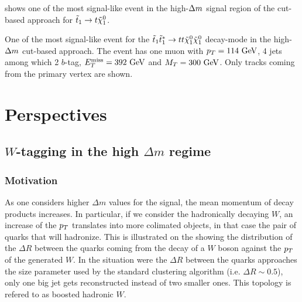      shows one of the most signal-like event in the
    high-$\Delta m$ signal region of the cut-based approach for $\tilde{t}_1 \rightarrow t \tilde{\chi}_1^0$.

    {One of the most signal-like event for the $\tilde{t}_1 \tilde{t}_1^{*} \rightarrow t t \tilde{\chi}_1^0 \tilde{\chi}_1^0$ decay-mode in the high-$\Delta m$ cut-based approach. The event has one muon with $p_T = 114~\text{GeV}$, 4 jets among which 2 $b$-tag, $E_T^\text{miss} = 392~\text{GeV}$ and $M_T = 300 ~\text{GeV}$. Only tracks coming from the primary vertex are shown.}

    \newpage

    \section{Perspectives \label{sec:analysis_perspective}}

    \subsection{$W$-tagging in the high $\Delta m$ regime}

            \subsubsection{Motivation}

             As one considers higher $\Delta m$ values for the signal, the mean momentum of
             decay products increases. In particular, if we consider the hadronically
             decaying $W$, an increase of the $p_T$ translates into more colimated objects,
             in that case the pair of quarks that will hadronize. This is illustrated on
             the  showing the
             distribution of the $\Delta R$ between the
             quarks coming from the decay of a $W$ boson against the $p_T$ of the generated
             $W$. In the situation were the $\Delta R$ between the quarks approaches the
             size parameter used by the standard clustering algorithm (i.e. $\Delta R
             \sim 0.5$), only one big jet gets reconstructed instead of two smaller ones.
             This topology is refered to as boosted hadronic $W$.


